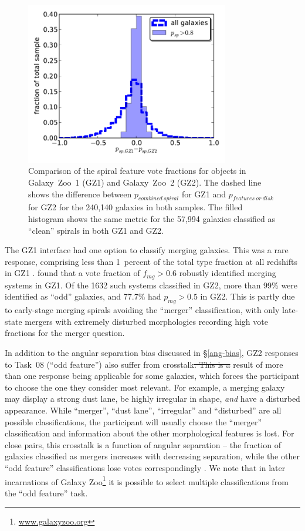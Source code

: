 \documentclass[useAMS,usenatbib]{mn2e}
\providecommand{\DIFaddtex}[1]{{\protect\color{blue}\uwave{#1}}} %
\providecommand{\DIFdeltex}[1]{{\protect\color{red}\sout{#1}}}                      %
\providecommand{\DIFaddbegin}{} %
\providecommand{\DIFaddend}{} %
\providecommand{\DIFdelbegin}{} %
\providecommand{\DIFdelend}{} %
\providecommand{\DIFadd}[1]{\texorpdfstring{\DIFaddtex{#1}}{#1}} %
\providecommand{\DIFdel}[1]{\texorpdfstring{\DIFdeltex{#1}}{}} %
\begin{document}
\begin{figure}
\includegraphics[angle=0,width=3.5in]{figures/gz1_gz2.pdf}
\caption{Comparison of the spiral feature vote fractions for objects in Galaxy~Zoo~1 (GZ1) and Galaxy~Zoo~2 (GZ2). The dashed line shows the difference between $p_{combined~spiral}$ for GZ1 and $p_{features~or~disk}$ for GZ2 for the 240,140 galaxies in both samples. The filled histogram shows the same metric for the 57,994 galaxies classified as ``clean'' spirals in both GZ1 and GZ2. 
\label{fig-gz1_gz2}}
\end{figure}

The GZ1 interface had one option to classify merging galaxies. This was a rare response, comprising less than 1~percent of the total type fraction at all redshifts in GZ1 \citep{bam09}. \citet{dar10a} found that a vote fraction of $f_{mg} > 0.6$ robustly identified merging systems in GZ1. Of the 1632 such systems classified in GZ2, more than 99\% were identified as ``odd'' galaxies, and 77.7\% had $p_{mg}>0.5$ in GZ2. This is partly due to early-stage merging spirals avoiding the ``merger'' classification, with only late-state mergers with extremely disturbed morphologies recording high vote fractions for the merger question. 

In addition to the angular separation bias discussed in \S\ref{ang-bias}, GZ2 responses to Task~08 (``odd feature'') also suffer from crosstalk\DIFdelbegin \DIFdel{. This is a }\DIFdelend \DIFaddbegin \DIFadd{, the }\DIFaddend result of more than one response being applicable for some galaxies, which forces the participant to choose the one they consider most relevant. For example, a merging galaxy may display a strong dust lane, be highly irregular in shape, {\em and} have a disturbed appearance. While ``merger'', ``dust lane'', ``irregular'' and ``disturbed'' are all possible classifications, the participant will usually choose the ``merger'' classification and information about the other morphological features is lost. For close pairs, this crosstalk is a function of angular separation -- the fraction of galaxies classified as mergers increases with decreasing separation, while the other ``odd feature'' classifications lose votes correspondingly \citep{cas13}. We note that in later incarnations of Galaxy Zoo\footnote{\url{www.galaxyzoo.org}} it is possible to select multiple classifications from the ``odd feature'' task.
\end{document}

